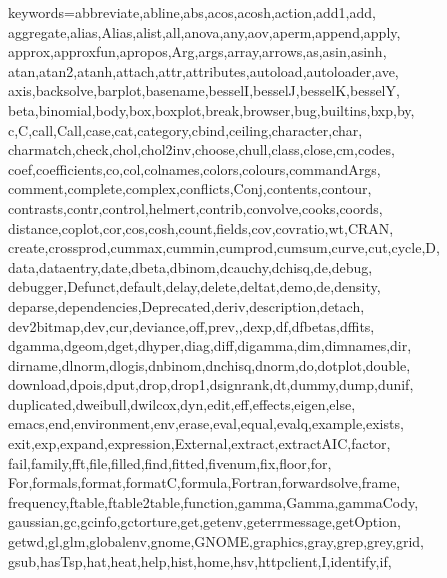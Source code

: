 \def\zz{\ifx\[$\else\aftergroup\zzz\fi}
\def\zzz{\setbox0\lastbox
    \dimen0\dimexpr\extrarowheight + \ht0-\dp0\relax
    \setbox0\hbox{\raise-.5\dimen0\box0}%
    \ht0=\dimexpr\ht0+\extrarowheight\relax
    \dp0=\dimexpr\dp0+\extrarowheight\relax
    \box0
}

%
{keywords={abbreviate,abline,abs,acos,acosh,action,add1,add,%
            aggregate,alias,Alias,alist,all,anova,any,aov,aperm,append,apply,%
            approx,approxfun,apropos,Arg,args,array,arrows,as,asin,asinh,%
            atan,atan2,atanh,attach,attr,attributes,autoload,autoloader,ave,%
            axis,backsolve,barplot,basename,besselI,besselJ,besselK,besselY,%
            beta,binomial,body,box,boxplot,break,browser,bug,builtins,bxp,by,%
            c,C,call,Call,case,cat,category,cbind,ceiling,character,char,%
            charmatch,check,chol,chol2inv,choose,chull,class,close,cm,codes,%
            coef,coefficients,co,col,colnames,colors,colours,commandArgs,%
            comment,complete,complex,conflicts,Conj,contents,contour,%
            contrasts,contr,control,helmert,contrib,convolve,cooks,coords,%
            distance,coplot,cor,cos,cosh,count,fields,cov,covratio,wt,CRAN,%
            create,crossprod,cummax,cummin,cumprod,cumsum,curve,cut,cycle,D,%
            data,dataentry,date,dbeta,dbinom,dcauchy,dchisq,de,debug,%
            debugger,Defunct,default,delay,delete,deltat,demo,de,density,%
            deparse,dependencies,Deprecated,deriv,description,detach,%
            dev2bitmap,dev,cur,deviance,off,prev,,dexp,df,dfbetas,dffits,%
            dgamma,dgeom,dget,dhyper,diag,diff,digamma,dim,dimnames,dir,%
            dirname,dlnorm,dlogis,dnbinom,dnchisq,dnorm,do,dotplot,double,%
            download,dpois,dput,drop,drop1,dsignrank,dt,dummy,dump,dunif,%
            duplicated,dweibull,dwilcox,dyn,edit,eff,effects,eigen,else,%
            emacs,end,environment,env,erase,eval,equal,evalq,example,exists,%
            exit,exp,expand,expression,External,extract,extractAIC,factor,%
            fail,family,fft,file,filled,find,fitted,fivenum,fix,floor,for,%
            For,formals,format,formatC,formula,Fortran,forwardsolve,frame,%
            frequency,ftable,ftable2table,function,gamma,Gamma,gammaCody,%
            gaussian,gc,gcinfo,gctorture,get,getenv,geterrmessage,getOption,%
            getwd,gl,glm,globalenv,gnome,GNOME,graphics,gray,grep,grey,grid,%
            gsub,hasTsp,hat,heat,help,hist,home,hsv,httpclient,I,identify,if,%
}}
